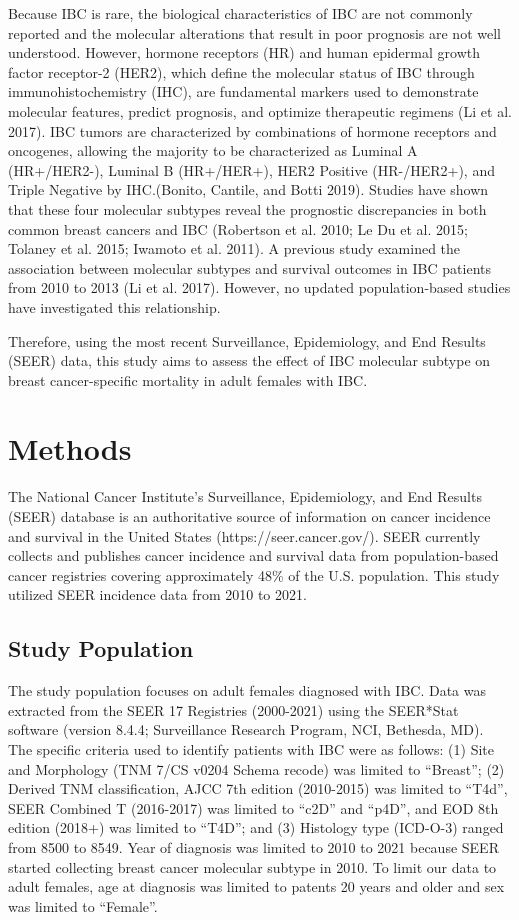 \documentclass[
  letterpaper,
  DIV=11,
  numbers=noendperiod]{scrartcl}
\begin{document}
Because IBC is rare, the biological characteristics of IBC are not
commonly reported and the molecular alterations that result in poor
prognosis are not well understood. However, hormone receptors (HR) and
human epidermal growth factor receptor-2 (HER2), which define the
molecular status of IBC through immunohistochemistry (IHC), are
fundamental markers used to demonstrate molecular features, predict
prognosis, and optimize therapeutic regimens (Li et al. 2017). IBC
tumors are characterized by combinations of hormone receptors and
oncogenes, allowing the majority to be characterized as Luminal A
(HR+/HER2-), Luminal B (HR+/HER+), HER2 Positive (HR-/HER2+), and Triple
Negative by IHC.(Bonito, Cantile, and Botti 2019). Studies have shown
that these four molecular subtypes reveal the prognostic discrepancies
in both common breast cancers and IBC (Robertson et al. 2010; Le Du et
al. 2015; Tolaney et al. 2015; Iwamoto et al. 2011). A previous study
examined the association between molecular subtypes and survival
outcomes in IBC patients from 2010 to 2013 (Li et al. 2017). However, no
updated population-based studies have investigated this relationship.

Therefore, using the most recent Surveillance, Epidemiology, and End
Results (SEER) data, this study aims to assess the effect of IBC
molecular subtype on breast cancer-specific mortality in adult females
with IBC.

\section{Methods}\label{methods}

The National Cancer Institute's Surveillance, Epidemiology, and End
Results (SEER) database is an authoritative source of information on
cancer incidence and survival in the United States
(https://seer.cancer.gov/). SEER currently collects and publishes cancer
incidence and survival data from population-based cancer registries
covering approximately 48\% of the U.S. population. This study utilized
SEER incidence data from 2010 to 2021.

\subsection{Study Population}\label{study-population}

The study population focuses on adult females diagnosed with IBC. Data
was extracted from the SEER 17 Registries (2000-2021) using the
SEER*Stat software (version 8.4.4; Surveillance Research Program, NCI,
Bethesda, MD). The specific criteria used to identify patients with IBC
were as follows: (1) Site and Morphology (TNM 7/CS v0204 Schema recode)
was limited to ``Breast''; (2) Derived TNM classification, AJCC 7th
edition (2010-2015) was limited to ``T4d'', SEER Combined T (2016-2017)
was limited to ``c2D'' and ``p4D'', and EOD 8th edition (2018+) was
limited to ``T4D''; and (3) Histology type (ICD-O-3) ranged from 8500 to
8549. Year of diagnosis was limited to 2010 to 2021 because SEER started
collecting breast cancer molecular subtype in 2010. To limit our data to
adult females, age at diagnosis was limited to patents 20 years and
older and sex was limited to ``Female''.
\end{document}
